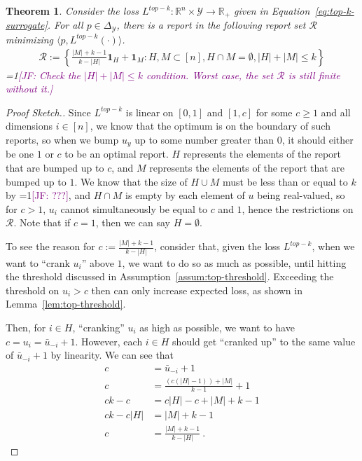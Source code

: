 \documentclass[12pt]{article}
\newcommand{\Comments}{1}
\newcommand{\mynote}[2]{\ifnum\Comments=1\textcolor{#1}{#2}\fi}
\newcommand{\jessie}[1]{\mynote{purple}{[JF: #1]}}
\newcommand{\reals}{\mathbb{R}}
\newcommand{\simplex}{\Delta_\Y}
\newcommand{\R}{\mathcal{R}}
\newcommand{\Y}{\mathcal{Y}}
\newcommand{\inprod}[2]{\langle #1, #2 \rangle}%
\newtheorem{theorem}{Theorem}
\begin{document}
\begin{theorem}\label{thm:finite-set}
	Consider the loss $L^{top-k} : \reals^n \times \Y \to \reals_+$ given in Equation~\ref{eq:top-k-surrogate}.  
	For all $p \in \simplex$, there is a report in the following report set $\R$ minimizing $\inprod{p}{L^{top-k}(\cdot)}$.
	\begin{align*}
	\R := \left\{ \frac{|M| + k -1}{k - |H|} \mathbf{1}_H + \mathbf{1}_M : H, M \subset [n], H\cap M = \emptyset, |H| + |M| \leq k \right\}
	\end{align*}
	\jessie{Check the $|H|+|M| \leq k$ condition. Worst case, the set $\R$ is still finite without it.}
\end{theorem}
\begin{proof}[Proof Sketch.]
	Since $L^{top-k}$ is linear on $[0,1]$ and $[1, c]$ for some $c \geq 1$ and all dimensions $i \in [n]$, we know that the optimum is on the boundary of such reports, so when we bump $u_y$ up to some number greater than $0$, it should either be one $1$ or $c$ to be an optimal report.
	$H$ represents the elements of the report that are bumped up to $c$, and $M$ represents the elements of the report that are bumped up to $1$.
	We know that the size of $H \cup M$ must be less than or equal to $k$ by \jessie{???}, and $H \cap M$ is empty by each element of $u$ being real-valued, so for $c > 1$, $u_i$ cannot simultaneously be equal to $c$ and $1$, hence the restrictions on $\R$.
	Note that if $c = 1$, then we can say $H = \emptyset$.
	
	To see the reason for $c := \frac{|M| + k -1}{k - |H|}$, consider that, given the loss $L^{top-k}$, when we want to ``crank $u_i$'' above $1$, we want to do so as much as possible, until hitting the threshold discussed in Assumption~\ref{assum:top-threshold}.
	Exceeding the threshold on $u_i > c$ then can only increase expected loss, as shown in Lemma~\ref{lem:top-threshold}.
	
	Then, for $i \in H$, ``cranking'' $u_i$ as high as possible, we want to have $c = u_i = \bar u _{-i} + 1$.
	However, each $i \in H$ should get ``cranked up'' to the same value of $\bar u_{-i} + 1$ by linearity.
	We can see that 
	\begin{align*}
	c &= \bar u_{-i} + 1 \\
	c &= \frac{(c (|H|-1)) + |M|}{k-1} + 1\\
	ck-c &= c|H| - c + |M| + k - 1\\
	ck - c|H| &= |M| + k - 1\\
	c &= \frac{|M|+k-1}{k-|H|}~.~
	\end{align*}
\end{proof}
\end{document}

